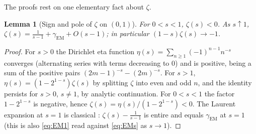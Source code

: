 \documentclass[11pt,reqno]{amsart}
\theoremstyle{plain}
\newtheorem{lemma}[theorem]{Lemma}
\theoremstyle{definition}
\theoremstyle{remark}
\numberwithin{equation}{section}
\begin{document}
The proofs rest on one elementary fact about $\zeta$.

\begin{lemma}[Sign and pole of $\zeta$ on $(0,1)$]\label{lem:zetaneg}
For $0<s<1$, $\zeta(s)<0$. As $s\uparrow1$, $\zeta(s)=\frac1{s-1}+\gamma_{\mathrm{EM}}+O(s-1)$; in particular $(1-s)\zeta(s)\to-1$.
\end{lemma}

\begin{proof}
For $s>0$ the Dirichlet eta function $\eta(s)=\sum_{n\ge1}(-1)^{n-1}n^{-s}$ converges (alternating series with terms decreasing to $0$) and is positive, being a sum of the positive pairs $(2m-1)^{-s}-(2m)^{-s}$. For $s>1$, $\eta(s)=(1-2^{1-s})\zeta(s)$ by splitting $\zeta$ into even and odd $n$, and the identity persists for $s>0$, $s\ne1$, by analytic continuation. For $0<s<1$ the factor $1-2^{1-s}$ is negative, hence $\zeta(s)=\eta(s)/(1-2^{1-s})<0$. The Laurent expansion at $s=1$ is classical \cite[\S2.1]{Titchmarsh1986}: $\zeta(s)-\frac1{s-1}$ is entire and equals $\gamma_{\mathrm{EM}}$ at $s=1$ (this is also \eqref{eq:EM1} read against \eqref{eq:EMs} as $s\to1$).
\end{proof}
\end{document}
